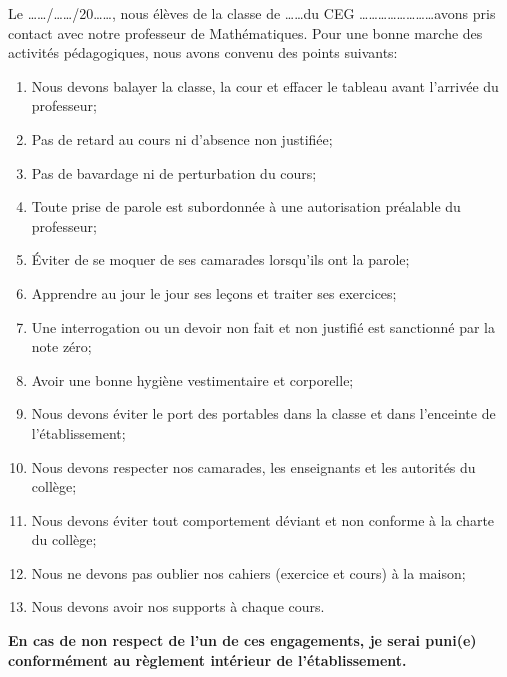   Le \dots \dots /\dots \dots/20\dots\dots, nous élèves de la classe de \dots \dots du CEG \dots\dots\dots\dots\dots\dots\dots\dots  avons pris contact avec notre professeur de Mathématiques. Pour une bonne marche des activités pédagogiques, nous avons convenu des points suivants:
  \begin{enumerate}
  	
  	\item  Nous devons balayer la classe, la cour et effacer le tableau avant l'arrivée du professeur;
  	\item Pas de retard au cours ni d'absence non justifiée;
  	\item Pas de bavardage ni de perturbation du cours;
  	\item Toute prise de parole est subordonnée à une autorisation préalable du professeur;
  	\item Éviter de se moquer de ses camarades lorsqu'ils ont la parole;
  	\item  Apprendre au jour le jour ses leçons et traiter ses exercices;
  	\item  Une interrogation ou un devoir non fait et non justifié est sanctionné par la note zéro;
  	\item Avoir une bonne hygiène vestimentaire et corporelle;
  	\item Nous devons éviter le port des portables  dans la classe et dans l'enceinte  de l'établissement;
  	\item Nous devons respecter nos camarades, les enseignants et les autorités du collège;
  	\item Nous devons éviter tout comportement déviant et non conforme à la charte du collège;
  	\item Nous ne devons pas oublier nos cahiers (exercice et cours) à la maison;
  	\item  Nous devons avoir nos supports à chaque cours.
  \end{enumerate}
  \textbf{En cas de non respect de l'un de ces engagements, je serai puni(e) conformément au règlement intérieur de l'établissement.}
  
